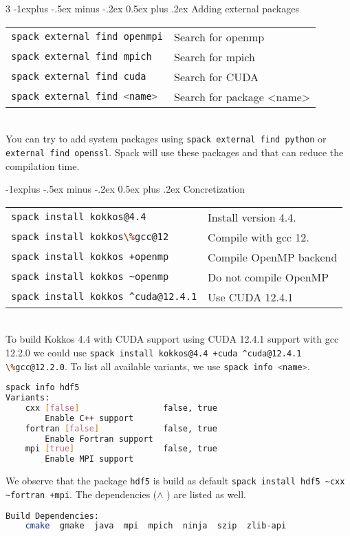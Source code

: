 \documentclass[10pt,landscape]{article}
\makeatletter
\renewcommand{\subsection}{\@startsection{subsection}{2}{0mm}%
                                {-1explus -.5ex minus -.2ex}%
                                {0.5ex plus .2ex}%
                                {\normalfont\normalsize\bfseries}}
\newcommand{\bash}[1]{\lstinline[language=bash]{#1}}
\makeatother
\begin{document}
\begin{multicols}{3}
\subsection{Adding external packages}
\begin{tabular}{@{}ll@{}}
\bash{spack external find openmpi} & Search for openmp \\ 
\bash{spack external find mpich} & Search for mpich \\ 
\bash{spack external find cuda} & Search for CUDA  \\
\bash{spack external find <name>} & Search for package <name>  \\
\end{tabular} \\
You can try to add system packages using \bash{spack external find python} or \bash{external find openssl}. Spack will use these packages and that can reduce the compilation time. 

\subsection{Concretization}
\begin{tabular}{@{}ll@{}}
\bash{spack install kokkos@4.4} & Install version 4.4. \\ 
\bash{spack install kokkos\%gcc@12} & Compile with gcc 12. \\ 
\bash{spack install kokkos +openmp} & Compile OpenMP backend \\ 
\bash{spack install kokkos ~openmp} & Do not compile OpenMP \\ 
\bash{spack install kokkos ^cuda@12.4.1} & Use CUDA 12.4.1 \\ 
\end{tabular} \\
To build Kokkos 4.4  with CUDA support using CUDA 12.4.1 support with gcc 12.2.0 we could use
\bash{spack install kokkos@4.4 +cuda ^cuda@12.4.1 \%gcc@12.2.0}.
To list all available variants, we use \bash{spack info <name>}.
\begin{lstlisting}[language=bash,style=mystyle]
spack info hdf5
Variants:
    cxx [false]                 false, true
        Enable C++ support
    fortran [false]             false, true
        Enable Fortran support
    mpi [true]                  false, true
        Enable MPI support
\end{lstlisting}
We observe that the package \bash{hdf5}  is build as default
\bash{spack install hdf5 ~cxx ~fortran +mpi}. The dependencies ($\wedge$ ) are listed as well.
\begin{lstlisting}[language=bash,style=mystyle]
Build Dependencies:
    cmake  gmake  java  mpi  mpich  ninja  szip  zlib-api


\end{lstlisting}
\end{multicols}
\end{document}
